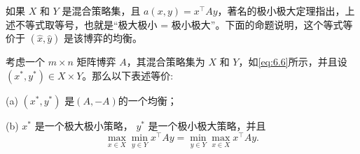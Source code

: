 如果 \(X\) 和 \(Y\) 是混合策略集，且 \(a\left( {x,y}\right)  = {x}^{\top }{Ay}\)，\citet{vonneumann1928}著名的极小极大定理指出，上述不等式取等号，也就是“极大极小 = 极小极大”。下面的命题说明，这个等式等价于 \(\left( {\widehat{x},\widehat{y}}\right)\) 是该博弈的均衡。

\begin{proposition}\label{prop:8.3}考虑一个 \(m \times  n\) 矩阵博弈 \(A\)，其混合策略集为 \(X\) 和 \(Y\)，如\eqref{eq:6.6}所示，并且设 \(\left( {{x}^{ * },{y}^{ * }}\right)  \in  X \times  Y\)。那么以下表述等价:

(a) \(\left( {{x}^{ * },{y}^{ * }}\right)\) 是$(A, -A)$的一个均衡；

(b) \({x}^{ * }\) 是一个极大极小策略， \({y}^{ * }\) 是一个极小极大策略，并且
\begin{equation}\label{eq:8.6}
\max_{{x \in  X}}\min_{{y \in  Y}}{x}^{\top }{Ay} = \min_{{y \in  Y}}\max_{{x \in  X}}{x}^{\top }{Ay}.
\end{equation}
\end{proposition}
